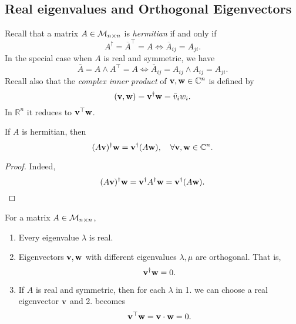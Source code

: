 \documentclass[10pt]{article}
\begin{document}
    \subsection{Real eigenvalues and Orthogonal Eigenvectors}
    Recall that a matrix $A\in {\mathcal{M}}_{n\times n}$ is \textit{hermitian} if and only if 
    \[
        A^{\dagger}=\overline{A}^{\top}=A \Leftrightarrow \overline{A}_{ij}=A_{ji}.
    \]
    In the special case when $A$ is real and symmetric, we have 
    \[
        \overline{A}=A \land A^{\top}=A \Leftrightarrow \overline{A}_{ij}=A_{ij}\land A_{ij}=A_{ji}.
    \]
    Recall also that the \textit{complex inner product} of ${\bf v},{\bf w} \in \mathbb{C}^{n}$ is defined by 
    \[
        ({\bf v},{\bf w})= {\bf v}^\dagger {\bf w}= \bar{v}_i w_i.
    \]
    In $ \mathbb{R}^{n} $ it reduces to $ {\bf v}^{\top} {\bf w} $.
    \begin{lemma}
        If $A$ is hermitian, then 
        \[
            (A{\bf v})^\dagger {\bf w}={\bf v}^\dagger (A{\bf w}),\quad \forall {\bf v},{\bf w}\in \mathbb{C}^{n}.
        \]
    \end{lemma}
    \begin{proof}
        Indeed, 
        \[
            (A{\bf v})^\dagger {\bf w} = {\bf v}^\dagger A^\dagger {\bf w} = {\bf v}^\dagger (A{\bf w}).
        \]
    \end{proof}
    \begin{theorem}\label{thm:eigen for hermitians}
        For a matrix $ A\in {\mathcal{M}}_{n\times n} $,
        \begin{enumerate}
            \item Every eigenvalue $ \lambda $ is real.
            \item Eigenvectors $ {\bf v},{\bf w} $ with different eigenvalues $ \lambda,\mu $ are orthogonal. That is,
            \[
                {\bf v}^\dagger {\bf w}=0.
            \]
            \item If $A$ is real and symmetric, then for each $ \lambda $ in 1. we can choose a real eigenvector $ {\bf v} $ and 2. becomes 
            \[
                {\bf v}^{\top}{\bf w}={\bf v} \cdot {\bf w}=0.
            \]
        \end{enumerate}
    \end{theorem}
\end{document}
